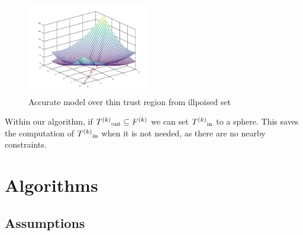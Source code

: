 \begin{figure}[h]
    \centering
    \includegraphics[width=200px]{images/poised_bad_but_good.png}
    \caption{Accurate model over thin trust region from illpoised set}
    \label{aoip}
\end{figure}


Within our algorithm, if $ {T^{(k)}}_{\text{out}} \subseteq {F}^{(k)}$ we can set ${T^{(k)}}_{\text{in}}$ to a sphere.
This saves the computation of ${T^{(k)}}_{\text{in}}$ when it is not needed, as there are no nearby constraints.



\section{Algorithms}

\subsection{Assumptions}
% 
% 
% 
% 

